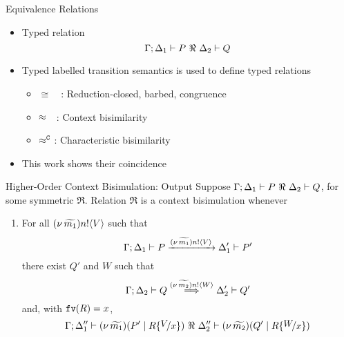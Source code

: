 \documentclass{beamer}
\begin{document}
	\begin{frame}{Equivalence Relations}
		\begin{itemize}

			\item	Typed relation
				\[
					\Gamma; \Delta_1 \vdash P\ \Re\ \Delta_2 \vdash Q 
				\]
			\item	Typed labelled transition semantics is used to define typed relations

			\begin{itemize}
				\item	$\cong$\ \ : Reduction-closed, barbed, congruence\\
				\item	$\approx$\ \ : Context bisimilarity\\
				\item	$\approx^\mathtt{C}$ : Characteristic bisimilarity
			\end{itemize}

			\item	This work shows their coincidence


		\end{itemize}
	\end{frame}


	\begin{frame}{Higher-Order Context Bisimulation: Output}
		Suppose $\Gamma; \Delta_1 \vdash P\ \Re\ \Delta_2 \vdash Q$, for some symmetric $\Re$. Relation $\Re$ is
		a context bisimulation whenever
		\begin{enumerate}[$(\star)$]
			\item	For all $(\nu\, \widetilde{m_1}) n ! \langle V \rangle$ such that
				\[
					\Gamma; \Delta_1 \vdash P \xrightarrow{(\nu\, \widetilde{m_1}) n ! \langle V \rangle} \Delta_1' \vdash P'
				\]
				there exist $Q'$ and $W$ such that 
				\[
					\Gamma; \Delta_2 \vdash Q \stackrel{(\nu\, \widetilde{m_2}) n ! \langle W \rangle}{\Longrightarrow} \Delta_2' \vdash Q'
				\]
				and,   with $\mathtt{fv}(R)=x$, 
				\[
					\Gamma; \Delta_1'' \proves \newsp{\widetilde{m_1}}{P' \Par R\subst{V}{x}}\ \Re\ \Delta_2'' \proves \newsp{\widetilde{m_2}}{Q' \Par R\subst{W}{x}}
				\]
		\end{enumerate}
	\end{frame}
\end{document}
